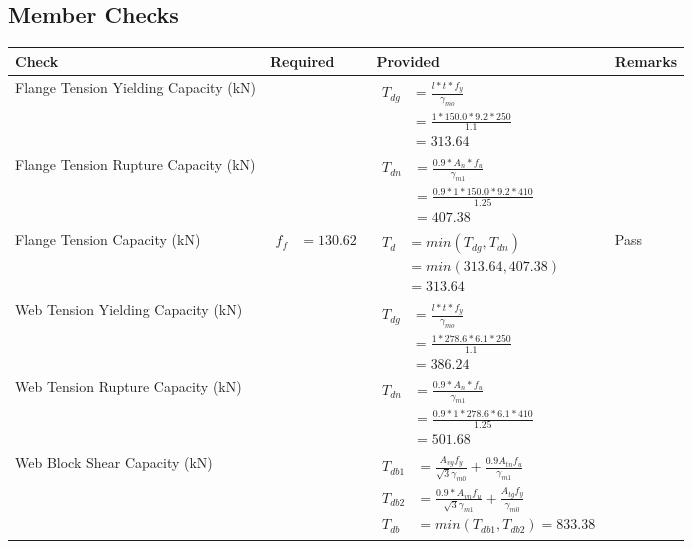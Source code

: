 \documentclass{article}%
\begin{document}
%
\newpage%
\subsection{Member Checks}%
\label{subsec:MemberChecks}%
\renewcommand{\arraystretch}{1.2}%
\begin{longtable}{|p{4cm}|p{6cm}|p{5.5cm}|p{1.5cm}|}%
\hline%
\rowcolor{OsdagGreen}%
Check&Required&Provided&Remarks\\%
\hline%
\endhead%
\hline%
Flange Tension Yielding Capacity (kN)&&$\begin{aligned} T_{dg} &= \frac{l*t*f_y}{\gamma_{mo}}\\ &=\frac{1*150.0*9.2*250}{1.1}\\ &=313.64\end{aligned}$&\\%
\hline%
Flange Tension Rupture Capacity (kN)&&$\begin{aligned} T_{dn} &= \frac{0.9*A_{n}*f_u}{\gamma_{m1}}\\ &=\frac{0.9*1*150.0*9.2*410}{1.25}\\ &=407.38\end{aligned}$&\\%
\hline%
Flange Tension Capacity (kN)&$\begin{aligned} f_f &=130.62\end{aligned}$&$\begin{aligned} T_d &= min(T_{dg},T_{dn})\\ &= min(313.64,407.38)\\ &=313.64\end{aligned}$&Pass\\%
\hline%
Web Tension Yielding Capacity (kN)&&$\begin{aligned} T_{dg} &= \frac{l*t*f_y}{\gamma_{mo}}\\ &=\frac{1*278.6*6.1*250}{1.1}\\ &=386.24\end{aligned}$&\\%
\hline%
Web Tension Rupture Capacity (kN)&&$\begin{aligned} T_{dn} &= \frac{0.9*A_{n}*f_u}{\gamma_{m1}}\\ &=\frac{0.9*1*278.6*6.1*410}{1.25}\\ &=501.68\end{aligned}$&\\%
\hline%
Web Block Shear Capacity (kN)&&$\begin{aligned}T_{db1} &= \frac{A_{vg} f_{y}}{\sqrt{3} \gamma_{m0}} + \frac{0.9 A_{tn} f_{u}}{\gamma_{m1}}\\ T_{db2} &= \frac{0.9*A_{vn} f_{u}}{\sqrt{3} \gamma_{m1}} + \frac{A_{tg} f_{y}}{\gamma_{m0}}\\ T_{db} &= min(T_{db1}, T_{db2})= 833.38\end{aligned}$&\\%

\end{longtable}
\end{document}
